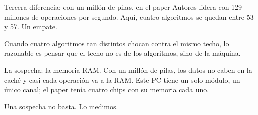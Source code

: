 Tercera diferencia: con un millón de pilas, en el paper Autores lidera con 129 millones de operaciones por segundo. Aquí, cuatro algoritmos se quedan entre 53 y 57. Un empate.

Cuando cuatro algoritmos tan distintos chocan contra el mismo techo, lo razonable es pensar que el techo no es de los algoritmos, sino de la máquina.

La sospecha: la memoria RAM. Con un millón de pilas, los datos no caben en la caché y casi cada operación va a la RAM. Este PC tiene un solo módulo, un único canal; el paper tenía cuatro chips con su memoria cada uno.

Una sospecha no basta. Lo medimos.
